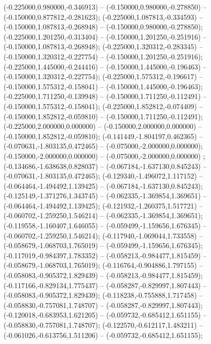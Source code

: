  (-0.225000,0.980000,-0.346913) -- (-0.150000,0.980000,-0.278850) -- (-0.150000,0.877812,-0.281623);
 (-0.225000,1.087813,-0.334593) -- (-0.150000,1.087813,-0.268948) -- (-0.150000,0.980000,-0.278850);
 (-0.225000,1.201250,-0.313404) -- (-0.150000,1.201250,-0.251916) -- (-0.150000,1.087813,-0.268948);
 (-0.225000,1.320312,-0.283345) -- (-0.150000,1.320312,-0.227754) -- (-0.150000,1.201250,-0.251916);
 (-0.225000,1.445000,-0.244416) -- (-0.150000,1.445000,-0.196463) -- (-0.150000,1.320312,-0.227754);
 (-0.225000,1.575312,-0.196617) -- (-0.150000,1.575312,-0.158041) -- (-0.150000,1.445000,-0.196463);
 (-0.225000,1.711250,-0.139948) -- (-0.150000,1.711250,-0.112491) -- (-0.150000,1.575312,-0.158041);
 (-0.225000,1.852812,-0.074409) -- (-0.150000,1.852812,-0.059810) -- (-0.150000,1.711250,-0.112491);
 (-0.225000,2.000000,0.000000) -- (-0.150000,2.000000,0.000000) -- (-0.150000,1.852812,-0.059810);
 (-0.141449,-1.804197,0.462365) -- (-0.070631,-1.803135,0.472465) -- (-0.075000,-2.000000,0.000000);
 (-0.150000,-2.000000,0.000000) -- (-0.075000,-2.000000,0.000000) ;
 (-0.134686,-1.638638,0.828037) -- (-0.067184,-1.637130,0.845243) -- (-0.070631,-1.803135,0.472465);
 (-0.129340,-1.496072,1.117152) -- (-0.064464,-1.494492,1.139425) -- (-0.067184,-1.637130,0.845243);
 (-0.125149,-1.371276,1.343745) -- (-0.062335,-1.369854,1.369651) -- (-0.064464,-1.494492,1.139425);
 (-0.121932,-1.260375,1.517721) -- (-0.060702,-1.259250,1.546214) -- (-0.062335,-1.369854,1.369651);
 (-0.119558,-1.160407,1.646055) -- (-0.059499,-1.159656,1.676345) -- (-0.060702,-1.259250,1.546214);
 (-0.117940,-1.069044,1.733558) -- (-0.058679,-1.068703,1.765019) -- (-0.059499,-1.159656,1.676345);
 (-0.117019,-0.984397,1.783352) -- (-0.058213,-0.984477,1.815459) -- (-0.058679,-1.068703,1.765019);
 (-0.116764,-0.904886,1.797155) -- (-0.058083,-0.905372,1.829439) -- (-0.058213,-0.984477,1.815459);
 (-0.117166,-0.829134,1.775437) -- (-0.058287,-0.829997,1.807443) -- (-0.058083,-0.905372,1.829439);
 (-0.118238,-0.755888,1.717458) -- (-0.058830,-0.757081,1.748707) -- (-0.058287,-0.829997,1.807443);
 (-0.120018,-0.683953,1.621205) -- (-0.059732,-0.685412,1.651155) -- (-0.058830,-0.757081,1.748707);
 (-0.122570,-0.612117,1.483211) -- (-0.061026,-0.613756,1.511206) -- (-0.059732,-0.685412,1.651155);
